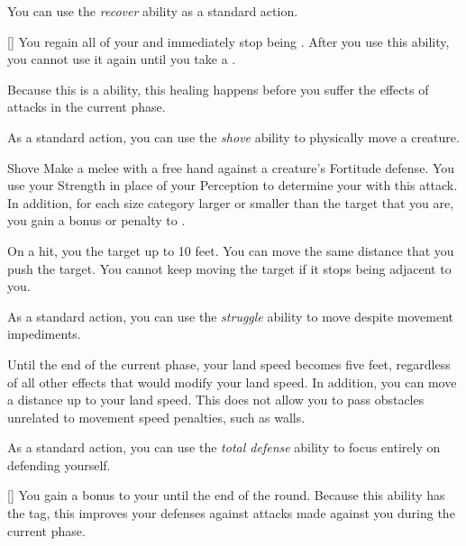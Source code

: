         You can use the \textit{recover} ability as a standard action.
        \begin{apability}{}[]
            You regain all of your  and immediately stop being .
            After you use this ability, you cannot use it again until you take a .

            Because this is a  ability, this healing happens before you suffer the effects of attacks in the current phase.
        \end{apability}

         As a standard action, you can use the \textit{shove} ability to physically move a creature.

        \begin{freeability}{Shove}\label{Shove}
            Make a melee  with a free hand against a creature's Fortitude defense.
            You use your Strength in place of your Perception to determine your  with this attack.
            In addition, for each size category larger or smaller than the target that you are, you gain a  bonus or penalty to .

            On a hit, you  the target up to 10 feet.
            You can move the same distance that you push the target.
            You cannot keep moving the target if it stops being adjacent to you.
        \end{freeability}

         As a standard action, you can use the \textit{struggle} ability to move despite movement impediments.

        \begin{freeability}{}
            Until the end of the current phase, your land speed becomes five feet, regardless of all other effects that would modify your land speed.
            In addition, you can move a distance up to your land speed.
            This does not allow you to pass obstacles unrelated to movement speed penalties, such as walls.
        \end{freeability}

         As a standard action, you can use the \textit{total defense} ability to focus entirely on defending yourself.

        \begin{freeability}{}[]
            You gain a  bonus to your  until the end of the round.
            Because this ability has the  tag, this improves your defenses against attacks made against you during the current phase.
        \end{freeability}


